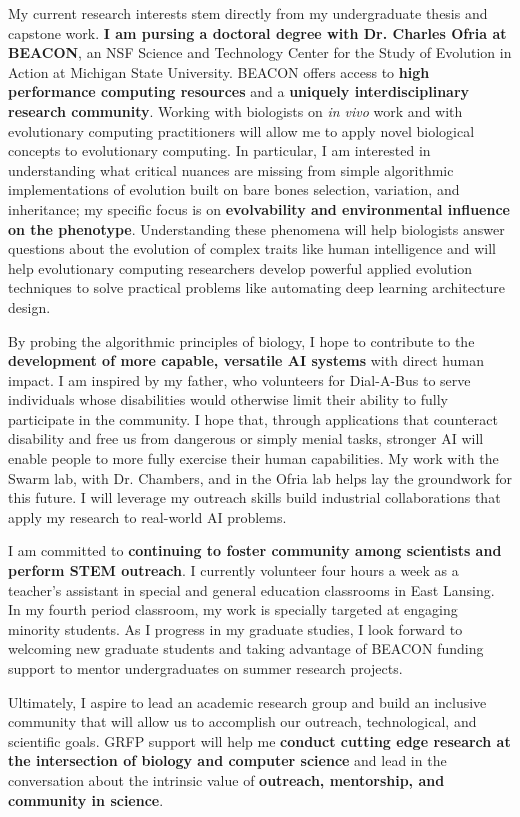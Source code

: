 \noindent
\underline{}
My current research interests stem directly from my undergraduate thesis and capstone work.
\textbf{I am pursing a doctoral degree with Dr. Charles Ofria at BEACON}, an NSF Science and Technology Center for the Study of Evolution in Action at Michigan State University.
BEACON offers access to \textbf{high performance computing resources} and a \textbf{uniquely interdisciplinary research community}.
Working with biologists on \textit{in vivo} work and with evolutionary computing practitioners will allow me to apply novel biological concepts to evolutionary computing.
In particular, I am interested in understanding what critical nuances are missing from simple algorithmic implementations of evolution built on bare bones selection, variation, and inheritance;
my specific focus is on \textbf{evolvability and environmental influence on the phenotype}.
Understanding these phenomena will help biologists answer questions about the evolution of complex traits like human intelligence and will help evolutionary computing researchers develop powerful applied evolution techniques to solve practical problems like automating deep learning architecture design.

By probing the algorithmic principles of biology, I hope to contribute to the \textbf{development of more capable, versatile AI systems} with direct human impact.
I am inspired by my father, who volunteers for Dial-A-Bus to serve individuals whose disabilities would otherwise limit their ability to fully participate in the community.
I hope that, through applications that counteract disability and free us from dangerous or simply menial tasks, stronger AI will enable people to more fully exercise their human capabilities.
My work with the Swarm lab, with Dr. Chambers, and in the Ofria lab helps lay the groundwork for this future.
I will leverage my outreach skills build industrial collaborations that apply my research to real-world AI problems.

I am committed to \textbf{continuing to foster community among scientists and perform STEM outreach}.
I currently volunteer four hours a week as a teacher's assistant in special and general education classrooms in East Lansing.
In my fourth period classroom, my work is specially targeted at engaging minority students.
As I progress in my graduate studies, I look forward to welcoming new graduate students and taking advantage of BEACON funding support to mentor undergraduates on summer research projects.

Ultimately, I aspire to lead an academic research group and build an inclusive community that will allow us to accomplish our outreach, technological, and scientific goals.
GRFP support will help me \textbf{conduct cutting edge research at the intersection of biology and computer science} and lead in the conversation about the intrinsic value of \textbf{outreach, mentorship, and community in science}.
